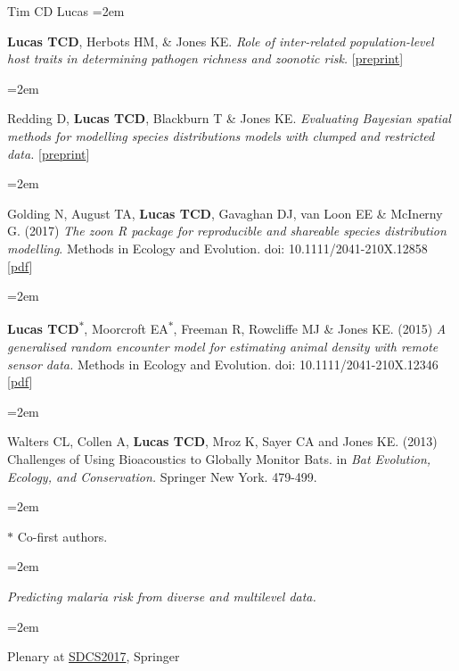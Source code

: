 \documentclass{scrartcl}
\newcommand{\MarginText}[1]{\marginpar{\raggedleft\itshape\small#1}} %
\newcommand{\Description}[1]{\hangindent=2em\hangafter=0\noindent\raggedright\footnotesize{#1}\par\normalsize\vspace{1em}} %
\newcommand{\MoreDescription}[1]{\hangindent=2em\hangafter=0\noindent\raggedright\scriptsize{#1}\par\normalsize\vspace{1em}} %
\begin{document}
\begin{cv}{Tim {\Large CD} Lucas}
\Description{\MarginText{2017}\textbf{Lucas TCD}, Herbots HM, \& Jones KE. \emph{Role of inter-related population-level host traits in determining pathogen richness and zoonotic risk.} [\href{http://biorxiv.org/content/early/2017/04/02/123067}{preprint}]}

\Description{Redding D, \textbf{Lucas TCD}, Blackburn T \& Jones KE. \emph{Evaluating Bayesian spatial methods for modelling species distributions models with clumped and restricted data.} [\href{http://biorxiv.org/content/early/2017/02/06/105742}{preprint}]}

\Description{Golding N, August TA, \textbf{Lucas TCD}, Gavaghan DJ, van Loon EE \& McInerny G. (2017) \emph{The zoon R package for reproducible and shareable species distribution modelling}. Methods in Ecology and Evolution. doi: 10.1111/2041-210X.12858 [\href{http://onlinelibrary.wiley.com/doi/10.1111/2041-210X.12858/pdf}{pdf}]}

\Description{\MarginText{2015}\textbf{Lucas TCD}\textsuperscript{$\ast$}, Moorcroft EA\textsuperscript{$\ast$}, Freeman R, Rowcliffe MJ \& Jones KE. (2015) \emph{A generalised random encounter model for estimating animal density with remote sensor data.} Methods in Ecology and Evolution. doi: 10.1111/2041-210X.12346 [\href{http://onlinelibrary.wiley.com/doi/10.1111/2041-210X.12346/epdf}{pdf}]}

\Description{\MarginText{2013}Walters CL, Collen A, \textbf{Lucas TCD}, Mroz K, Sayer CA and Jones KE. (2013) Challenges of Using Bioacoustics to Globally Monitor Bats. in \emph{Bat Evolution, Ecology, and Conservation.} Springer New York. 479-499.}

\Description{\MarginText{} \scriptsize{ $\ast$ Co-first authors. } }


\vspace{1em} %



{\color{Maroon}}\vspace{1em}

\Description{\MarginText{2017}\emph{Predicting malaria risk from diverse and multilevel data.}}\vspace{-1em}
\MoreDescription{Plenary at \href{http://www.springer.com/gb/book/9789811072413}{SDCS2017}, Springer}
\vspace{-0.5em}



\end{cv}
\end{document}
